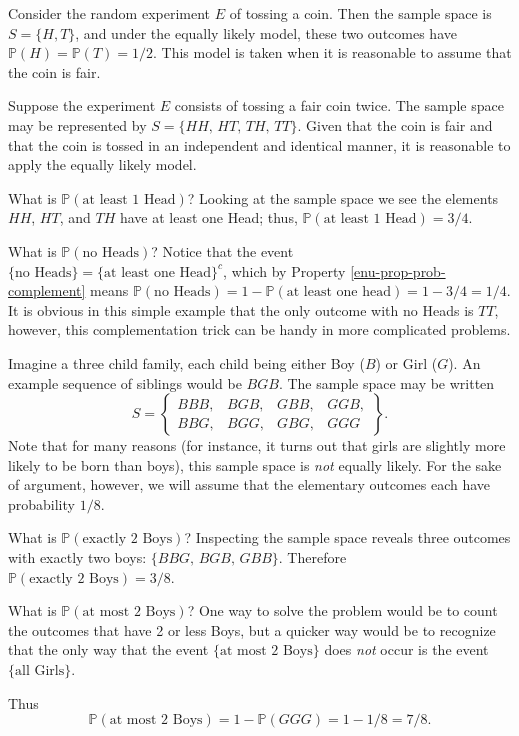 \documentclass[captions=tableheading]{scrbook}
\begin{document}
\begin{example}
Consider the random experiment \(E\) of tossing a coin. Then the sample space is \(S=\{H,T\}\), and under the equally likely model, these two outcomes have \(\mathbb{P}(H)=\mathbb{P}(T)=1/2\). This model is taken when it is reasonable to assume that the coin is fair.
\end{example}

\begin{example}
Suppose the experiment \(E\) consists of tossing a fair coin twice. The sample space may be represented by \(S=\{HH,\, HT,\, TH,\, TT\}\). Given that the coin is fair and that the coin is tossed in an independent and identical manner, it is reasonable to apply the equally likely model. 

What is \(\mathbb{P}(\mbox{at least 1 Head})\)? Looking at the sample space we see the elements \(HH\), \(HT\), and \(TH\) have at least one Head; thus, \(\mathbb{P}(\mbox{at least 1 Head})=3/4\). 

What is \(\mathbb{P}(\mbox{no Heads})\)? Notice that the event \(\{ \mbox{no Heads} \} = \{ \mbox{at least one Head} \} ^{c}\), which by Property \ref{enu-prop-prob-complement} means \(\mathbb{P}(\mbox{no Heads})=1-\mathbb{P}(\mbox{at least one head})=1-3/4=1/4\). It is obvious in this simple example that the only outcome with no Heads is \(TT\), however, this complementation trick can be handy in more complicated problems.
\end{example}

\begin{example}
Imagine a three child family, each child being either Boy (\(B\)) or Girl (\(G\)). An example sequence of siblings would be \(BGB\). The sample space may be written
\[
S=\left\{ 
\begin{array}{cccc}
BBB, & BGB, & GBB, & GGB,\\
BBG, & BGG, & GBG, & GGG
\end{array}
\right\}.
\]
Note that for many reasons (for instance, it turns out that girls are slightly more likely to be born than boys), this sample space is \emph{not} equally likely. For the sake of argument, however, we will assume that the elementary outcomes each have probability \(1/8\).

What is \(\mathbb{P}(\mbox{exactly 2 Boys})\)? Inspecting the sample space reveals three outcomes with exactly two boys: \( \{ BBG,\, BGB,\, GBB \} \).  Therefore \(\mathbb{P}(\mbox{exactly 2 Boys})=3/8\). 

What is \(\mathbb{P}(\mbox{at most 2 Boys})\)? One way to solve the problem would be to count the outcomes that have 2 or less Boys, but a quicker way would be to recognize that the only way that the event \(\{ \mbox{at most 2 Boys} \}\) does \emph{not} occur is the event \(\{ \mbox{all Girls} \}\).

Thus
\[
\mathbb{P}(\mbox{at most 2 Boys})=1-\mathbb{P}(GGG)=1-1/8=7/8.
\]

\end{example}
\end{document}
